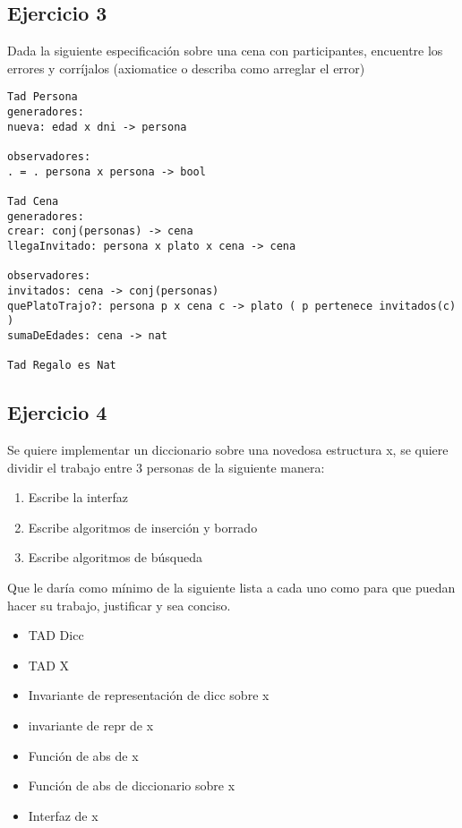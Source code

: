 \documentclass[10pt, a4paper]{article}
\begin{document}
\subsection*{Ejercicio 3}

Dada la siguiente especificaci\'on sobre una cena con participantes, encuentre los errores y corr\'ijalos (axiomatice o describa como arreglar el error)

\begin{verbatim}
Tad Persona
generadores:
nueva: edad x dni -> persona

observadores:
. = . persona x persona -> bool

Tad Cena
generadores:
crear: conj(personas) -> cena
llegaInvitado: persona x plato x cena -> cena

observadores:
invitados: cena -> conj(personas)
quePlatoTrajo?: persona p x cena c -> plato ( p pertenece invitados(c) )
sumaDeEdades: cena -> nat

Tad Regalo es Nat
\end{verbatim}


\subsection*{Ejercicio 4}

Se quiere implementar un diccionario sobre una novedosa estructura x, se quiere dividir el trabajo entre 3 personas de la siguiente manera:
\begin{enumerate}
 \item Escribe la interfaz
 \item Escribe algoritmos de inserci\'on y borrado 
 \item Escribe algoritmos de b\'usqueda
\end{enumerate}

Que le dar\'ia como m\'inimo de la siguiente lista a cada uno como para que puedan hacer su trabajo, justificar y sea conciso.

\begin{itemize}
 \item TAD Dicc
 \item TAD X
 \item Invariante de representaci\'on de dicc sobre x
 \item invariante de repr de x
 \item Funci\'on de abs de x
 \item Funci\'on de abs de diccionario sobre x
 \item Interfaz de x
\end{itemize}
\end{document}
